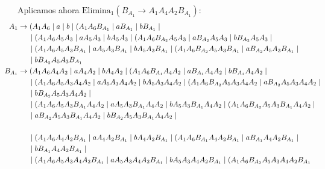 \documentclass[12pt]{article}
\begin{document}
\begin{ejercicio}[2.5 puntos]
\begin{description}
        Aplicamos ahora $\text{Elimina}_1(B_{A_1}\rightarrow A_1 A_4 A_2 B_{A_1})$:
        \begin{align*}
            \hspace{-2.5cm}A_1 &\to (A_1 A_6 \mid a \mid b\mid (A_1 A_6 B_{A_1} \mid a B_{A_1} \mid b B_{A_1}
                \mid \\ & \hspace{0.5cm} \mid (A_1 A_6A_5A_3 \mid aA_5A_3 \mid bA_5A_3 \mid (A_1 A_6 B_{A_2}A_5A_3 \mid  a B_{A_2}A_5A_3 \mid  b B_{A_2}A_5A_3
                \mid \\ & \hspace{0.5cm} \mid (A_1 A_6 A_5 A_3 B_{A_1} \mid aA_5 A_3 B_{A_1} \mid bA_5 A_3 B_{A_1} \mid (A_1 A_6 B_{A_2}A_5 A_3 B_{A_1} \mid  a B_{A_2}A_5 A_3 B_{A_1}
                \mid \\ & \hspace{0.5cm} \mid b B_{A_2}A_5 A_3 B_{A_1} \\
            \hspace{-2.5cm}B_{A_1} &\to (A_1 A_6 A_4 A_2 \mid aA_4 A_2 \mid bA_4 A_2\mid (A_1 A_6 B_{A_1}A_4 A_2 \mid a B_{A_1}A_4 A_2 \mid b B_{A_1}A_4 A_2
                \mid \\ & \hspace{0.5cm} \mid (A_1 A_6A_5A_3A_4 A_2 \mid aA_5A_3 A_4 A_2\mid bA_5A_3A_4 A_2 \mid (A_1 A_6 B_{A_2}A_5A_3 A_4 A_2\mid  a B_{A_2}A_5A_3A_4 A_2
                \mid \\ & \hspace{0.5cm} \mid b B_{A_2}A_5A_3A_4 A_2
                \mid \\ & \hspace{0.5cm} \mid (A_1 A_6 A_5 A_3 B_{A_1}A_4 A_2 \mid aA_5 A_3 B_{A_1}A_4 A_2 \mid bA_5 A_3 B_{A_1}A_4 A_2 \mid (A_1 A_6 B_{A_2}A_5 A_3 B_{A_1}A_4 A_2
                \mid \\ & \hspace{0.5cm} \mid  a B_{A_2}A_5 A_3 B_{A_1}A_4 A_2 \mid b B_{A_2}A_5 A_3 B_{A_1}A_4 A_2
                \mid \\ \hspace{-2.5cm}\\ & \hspace{0.5cm} \mid (A_1 A_6 A_4 A_2 B_{A_1} \mid aA_4 A_2 B_{A_1} \mid bA_4 A_2 B_{A_1}\mid (A_1 A_6 B_{A_1}A_4 A_2 B_{A_1} \mid a B_{A_1}A_4 A_2 B_{A_1}
                \mid \\ & \hspace{0.5cm} \mid b B_{A_1}A_4 A_2 B_{A_1}
                \mid \\ & \hspace{0.5cm} \mid (A_1 A_6A_5A_3A_4 A_2 B_{A_1} \mid aA_5A_3 A_4 A_2 B_{A_1}\mid bA_5A_3A_4 A_2 B_{A_1} \mid (A_1 A_6 B_{A_2}A_5A_3 A_4 A_2 B_{A_1}

\end{align*}
\end{description}
\end{ejercicio}
\end{document}
